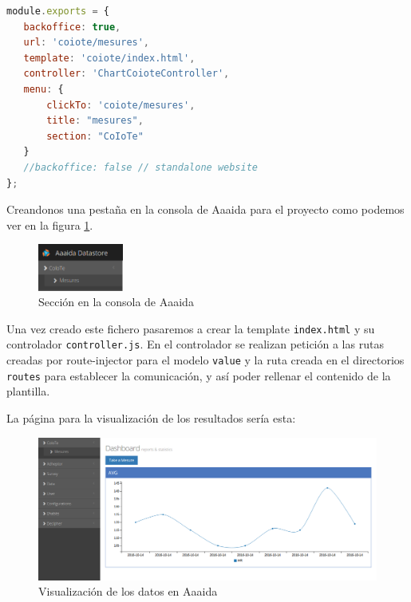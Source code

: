 \begin{lstlisting}[language=JavaScript]
module.exports = {
   backoffice: true,
   url: 'coiote/mesures',
   template: 'coiote/index.html',
   controller: 'ChartCoioteController',
   menu: {
       clickTo: 'coiote/mesures',
       title: "mesures",
       section: "CoIoTe"
   }
   //backoffice: false // standalone website
};
\end{lstlisting}

Creandonos una pestaña en la consola de Aaaida para el proyecto como podemos ver en la figura \ref{sec:coioteSec}. 

\begin{figure}[htb]
\begin{center}
\includegraphics[width=0.25\textwidth]{./setup/arquitecturaCoiote}
\caption{Sección en la consola de Aaaida}
\label{sec:coioteSec}
\end{center}
\end{figure}

Una vez creado este fichero pasaremos a crear la template \texttt{index.html} y su controlador \texttt{controller.js}. En el controlador se realizan petición a las rutas creadas por route-injector para el modelo \texttt{value} y la ruta creada en el directorios \texttt{routes} para establecer la comunicación, y así poder rellenar el contenido de la plantilla.

La página para la visualización de los resultados sería esta:

\begin{figure}[htb]
\begin{center}
\includegraphics[width=1\textwidth]{./setup/visualizacionPaginaCoiote}
\caption{Visualización de los datos en Aaaida}
\end{center}
\end{figure}
\pagebreak

